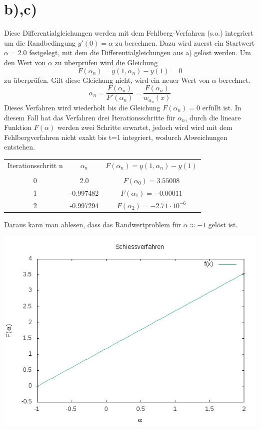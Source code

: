 \documentclass{scrreprt}
\begin{document}
\section*{b),c)}
Diese Differentialgleichungen werden mit dem Fehlberg-Verfahren (s.o.) integriert um die Randbedingung $y'(0)=\alpha$ zu berechnen.
Dazu wird zuerst ein Startwert $\alpha=2.0$ festgelegt, mit dem die Differentialgleichungen aus a) gelöst werden. Um den Wert von $\alpha$ zu überprüfen wird die Gleichung
\[
F(\alpha_n)=y(1,\alpha_n)-y(1)=0
\]
zu überprüfen. Gilt diese Gleichung nicht, wird ein neuer Wert von $\alpha$ berechnet.
\[
\alpha_n = \frac{F(\alpha_n)}{F'(\alpha_n)} = \frac{F(\alpha_n)}{w_{\alpha_n}(x)}
\]
Dieses Verfahren wird wiederholt bis die Gleichung $F(\alpha_n)=0$ erfüllt ist.
In diesem Fall hat das Verfahren drei Iterationsschritte für $\alpha_n$, durch die lineare Funktion $F(\alpha)$ werden zwei Schritte erwartet, jedoch wird wird mit dem Fehlbergverfahren nicht exakt bis t=1 integriert, wodurch Abweichungen entstehen.
\begin{center}
	\begin{tabular}{ccc}
		Iterationsschritt n & $\alpha_n$ & $F(\alpha_n)=y(1,\alpha_n)-y(1)$ \\
		\\
		0 & 2.0 & $F(\alpha_0)=3.55008$\\
		1 & -0.997482 & $F(\alpha_1)=-0.00011$\\
		2 & -0.997294 & $F(\alpha_2)=-2.71\cdot10^{-6}$\\
	\end{tabular}
\end{center}
Daraus kann man ablesen, dass das Randwertproblem für $\alpha \approx -1$ gelöst ist.
\begin{center}
	\includegraphics*[scale=0.7]{1.jpeg}
\end{center}
\end{document}
